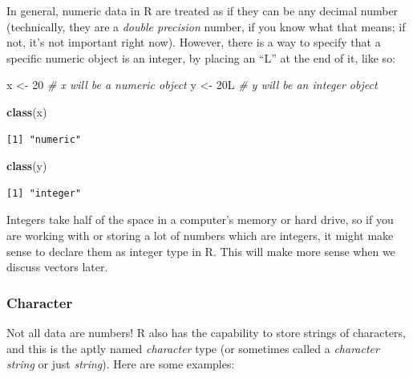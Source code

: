 \documentclass[
]{article}
\newenvironment{Shaded}{\begin{snugshade}}{\end{snugshade}}
\newcommand{\CommentTok}[1]{\textcolor[rgb]{0.56,0.35,0.01}{\textit{#1}}}
\newcommand{\DecValTok}[1]{\textcolor[rgb]{0.00,0.00,0.81}{#1}}
\newcommand{\KeywordTok}[1]{\textcolor[rgb]{0.13,0.29,0.53}{\textbf{#1}}}
\newcommand{\NormalTok}[1]{#1}
\newcommand{\StringTok}[1]{\textcolor[rgb]{0.31,0.60,0.02}{#1}}
\begin{document}
In general, numeric data in R are treated as if they can be any decimal number (technically, they are a \emph{double precision} number, if you know what that means; if not, it's not important right now).
However, there is a way to specify that a specific numeric object is an integer, by placing an ``L'' at the end of it, like so:

\begin{Shaded}
\begin{Highlighting}[]
\NormalTok{x <-}\StringTok{ }\DecValTok{20}   \CommentTok{# x will be a numeric object}
\NormalTok{y <-}\StringTok{ }\NormalTok{20L  }\CommentTok{# y will be an integer object}
\end{Highlighting}
\end{Shaded}

\begin{Shaded}
\begin{Highlighting}[]
\KeywordTok{class}\NormalTok{(x)}
\end{Highlighting}
\end{Shaded}

\begin{verbatim}
[1] "numeric"
\end{verbatim}

\begin{Shaded}
\begin{Highlighting}[]
\KeywordTok{class}\NormalTok{(y)}
\end{Highlighting}
\end{Shaded}

\begin{verbatim}
[1] "integer"
\end{verbatim}

Integers take half of the space in a computer's memory or hard drive, so if you are working with or storing a lot of numbers which are integers, it might make sense to declare them as integer type in R.
This will make more sense when we discuss vectors later.

\hypertarget{character}{%
\subsubsection{Character}\label{character}}

Not all data are numbers!
R also has the capability to store strings of characters, and this is the aptly named \emph{character} type (or sometimes called a \emph{character string} or just \emph{string}).
Here are some examples:
\end{document}

